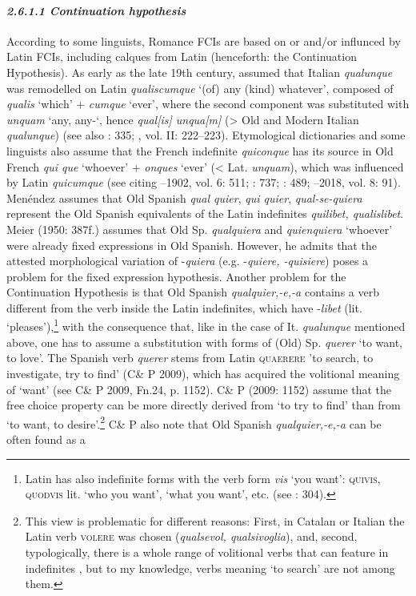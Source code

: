 \paragraph{\textit{2.6.1.1 Continuation hypothesis}}

According to some linguists, Romance FCIs are based on or and/or influnced by Latin FCIs, including calques from Latin (henceforth: the Continuation Hypothesis). As early as the late 19th century, \citet[57]{Meyer-Lübke1899} assumed that Italian \textit{qualunque} was remodelled on Latin \textit{qualiscumque} ‘(of) any (kind) whatever’, composed of \textit{qualis} ‘which’ + \textit{cumque} ‘ever’, where the second component was substituted with \textit{unquam} ‘any, any-‘, hence \textit{qual[is] unqua[m]} (> Old and Modern Italian \textit{qualunque}) (see also \citealt{CortalazzoZolli1979}: 335; \citealt{Rohlfs1968}, vol. II: 222–223). Etymological dictionaries and some linguists also assume that the French indefinite \textit{quiconque} has its source in Old French \textit{qui que} ‘whoever’ + \textit{onques} ‘ever’ (< Lat. \textit{unquam}), which was influenced by Latin \textit{quicumque} (see \citealt{Becker2014} citing \citealt{Godefroy1880}–1902, vol. 6: 511; \citealt{Gamillscheg1969}: 737; \citealt{Greimas1998}: 489; \citealt{Tobler-Lommatzsch1925}–2018, vol. 8: 91). Menéndez \citet{Pidal1928} assumes that Old Spanish \textit{qual quier}, \textit{qui quier}, \textit{qual-se-quiera} represent the Old Spanish equivalents of the Latin indefinites \textit{quilibet, qualislibet}. Meier (1950: 387f.) assumes that Old Sp. \textit{qualquiera} and \textit{quienquiera} ‘whoever’ were already fixed expressions in Old Spanish. However, he admits that the attested morphological variation of -\textit{quiera} (e.g. -\textit{quiere, -quisiere}) poses a problem for the fixed expression hypothesis. Another problem for the Continuation Hypothesis is that Old Spanish \textit{qualquier,\nobreakdash-e,\nobreakdash-a} contains a verb different from the verb inside the Latin indefinites, which have -\textit{libet} (lit. ‘pleases’),\footnote{{Latin has also indefinite forms with the verb form} {\textit{vis}} {‘you want’:} {\textsc{quivis}}, {\textsc{quodvis}} {lit. ‘who you want’, ‘what you want’, etc. (see \citealt{Pato2012}: 304).}} with the consequence that, like in the case of It. \textit{qualunque} mentioned above, one has to assume a substitution with forms of (Old) Sp. \textit{querer} ‘to want, to love’. The Spanish verb \textit{querer} stems from Latin \textsc{quaerere} ’to search, to investigate, try to find’ (C\& P 2009), which has acquired the volitional meaning of ‘want’ (see C\& P 2009, Fn.24, p. 1152). C\& P (2009: 1152) assume that the free choice property can be more directly derived from ‘to try to find’ than from ‘to want, to desire’.\footnote{{This view is problematic for different reasons: First, in Catalan or Italian the Latin verb} {\textsc{volere}} {was chosen (}{\textit{qualsevol, qualsivoglia}}{), and, second, typologically, there is a whole range of volitional verbs that can feature in indefinites \citep{Haspelmath1997}, but to my knowledge, verbs meaning ‘to search’ are not among them.}} C\& P also note that Old Spanish \textit{qualquier,-e,-a} can be often found as a 